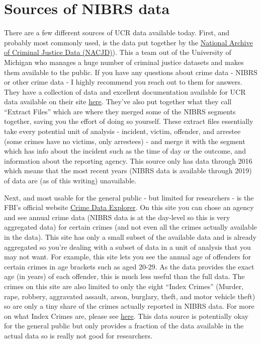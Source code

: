 \documentclass[
  12pt,
  openany]{book}
\begin{document}
\hypertarget{sources-of-nibrs-data}{%
\section{Sources of NIBRS data}\label{sources-of-nibrs-data}}

There are a few different sources of UCR data available today. First, and probably most commonly used, is the data put together by the \href{https://www.icpsr.umich.edu/web/pages/NACJD/index.html}{National Archive of Criminal Justice Data (NACJD)}). This a team out of the University of Michigan who manages a huge number of criminal justice datasets and makes them available to the public. If you have any questions about crime data - NIBRS or other crime data - I highly recommend you reach out to them for answers. They have a collection of data and excellent documentation available for UCR data available on their site \href{https://www.icpsr.umich.edu/web/NACJD/series/128}{here}. They've also put together what they call ``Extract Files'' which are where they merged some of the NIBRS segments together, saving you the effort of doing so yourself. These extract files essentially take every potential unit of analysis - incident, victim, offender, and arrestee (some crimes have no victims, only arrestees) - and merge it with the segment which has info about the incident such as the time of day or the outcome, and information about the reporting agency. This source only has data through 2016 which means that the most recent years (NIBRS data is available through 2019) of data are (as of this writing) unavailable.

Next, and most usable for the general public - but limited for researchers - is the FBI's official website \href{https://crime-data-explorer.fr.cloud.gov/}{Crime Data Explorer}. On this site you can chose an agency and see annual crime data (NIBRS data is at the day-level so this is very aggregated data) for certain crimes (and not even all the crimes actually available in the data). This site has only a small subset of the available data and is already aggregated so you're dealing with a subset of data in a unit of analysis that you may not want. For example, this site lets you see the annual age of offenders for certain crimes in age brackets such as aged 20-29. As the data provides the exact age (in years) of each offender, this is much less useful than the full data. The crimes on this site are also limited to only the eight ``Index Crimes'' (Murder, rape, robbery, aggravated assault, arson, burglary, theft, and motor vehicle theft) so are only a tiny share of the crimes actually reported in NIBRS data. For more on what Index Crimes are, please see \href{https://ucrbook.com/ucrGeneral.html\#indexCrimes}{here}. This data source is potentially okay for the general public but only provides a fraction of the data available in the actual data so is really not good for researchers.
\end{document}
